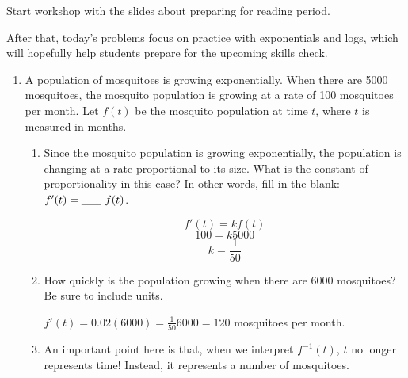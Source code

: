 \documentclass{article}
\begin{document}

\begin{workshop}
  Start workshop with the slides about preparing for reading period.

  After that, today's problems focus on practice with exponentials and logs, which will hopefully help students prepare for the upcoming skills check.
\end{workshop}

\begin{enumerate}
\item  A population of mosquitoes is growing exponentially.  When there are 5000 mosquitoes, the mosquito population is growing at a rate of 100 mosquitoes per month. Let $f(t)$ be the mosquito population at time $t$, where $t$ is measured in months. 

  \begin{enumerate}

  \item
    \begin{problem}[\vfill]
      Since the mosquito population is growing exponentially, the population is changing at a rate proportional to its size. What is the constant of proportionality in this case? In other words, fill in the blank: $f'(t) = \fitb{0.25in}{}\ f(t)$.
    \end{problem}

    \begin{solution} 
      $$f'(t) = kf(t)$$ 
      $$100=k5000$$ 
      $$k = \frac{1}{50}$$  
    \end{solution} 

  \item
    \begin{problem}[\vfill]
      How quickly is the population growing when there are 6000 mosquitoes? Be sure to include units.
    \end{problem}

    \begin{solution}
      $f'(t)=0.02(6000)=\frac{1}{50}6000=120$ mosquitoes per month.
    \end{solution}

  \item %

    \begin{workshop}
      An important point here is that, when we interpret $f^{-1}(t)$, $t$ no longer represents time! Instead, it represents a number of mosquitoes. 
    \end{workshop}


\end{enumerate}
\end{enumerate}
\end{document}
